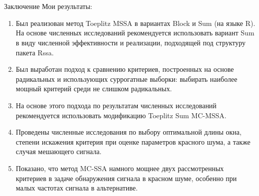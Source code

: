 \documentclass[pdf,notheorems,10pt,intlimits, unicode]{beamer}
\begin{document}
\section{}
\begin{frame}{Заключение}
  Мои результаты:
	\begin{enumerate}
		\item Был реализован метод Toeplitz MSSA в вариантах Block и Sum (на языке \textsf{R}). На основе численных исследований рекомендуется использовать вариант Sum в виду численной эффективности и реализации, подходящей под структуру пакета \textsf{Rssa}.
		\item Был выработан подход к сравнению критериев, построенных на основе радикальных и использующих суррогатные выборки: выбирать наиболее мощный критерий среди не слишком радикальных.
		\item На основе этого подхода по результатам численных исследований рекомендуется использовать модификацию Toeplitz Sum MC-MSSA.
    \item Проведены численные исследования по выбору оптимальной длины окна, степени искажения критерия при оценке параметров красного шума, а также случая мешающего сигнала. %
    \item Показано, что метод MC-SSA намного мощнее двух рассмотренных критериев в задаче обнаружения сигнала в красном шуме, особенно при малых частотах сигнала в альтернативе.
  \end{enumerate}
\end{frame}
\end{document}
